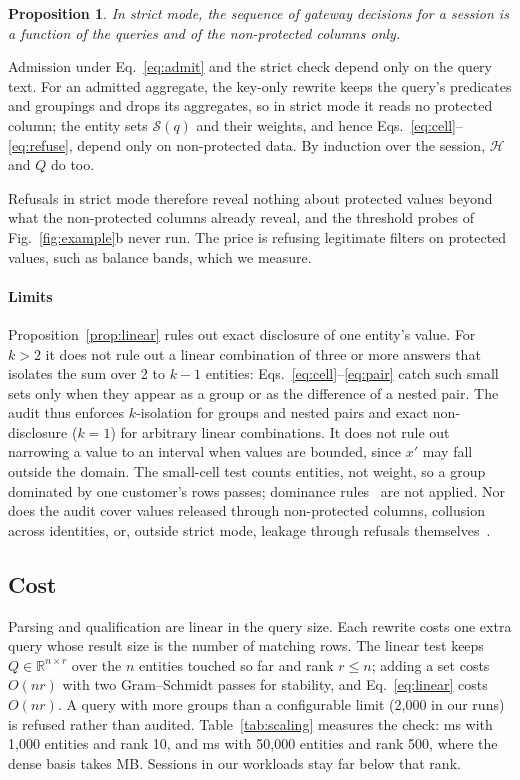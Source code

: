 \documentclass[10pt,journal,compsoc]{IEEEtran}
\newtheorem{proposition}{Proposition}
\begin{document}
\begin{proposition}\label{prop:strict}
In strict mode, the sequence of gateway decisions for a session is a function of the queries and of the non-protected columns only.
\end{proposition}
\begin{IEEEproof}
Admission under Eq.~\ref{eq:admit} and the strict check depend only on the query text. For an admitted aggregate, the key-only rewrite keeps the query's predicates and groupings and drops its aggregates, so in strict mode it reads no protected column; the entity sets $\mathcal{S}(q)$ and their weights, and hence Eqs.~\ref{eq:cell}--\ref{eq:refuse}, depend only on non-protected data. By induction over the session, $\mathcal{H}$ and $Q$ do too.
\end{IEEEproof}
Refusals in strict mode therefore reveal nothing about protected values beyond what the non-protected columns already reveal, and the threshold probes of Fig.~\ref{fig:example}b never run. The price is refusing legitimate filters on protected values, such as balance bands, which we measure.

\paragraph*{Limits} Proposition~\ref{prop:linear} rules out exact disclosure of one entity's value. For $k>2$ it does not rule out a linear combination of three or more answers that isolates the sum over 2 to $k-1$ entities: Eqs.~\ref{eq:cell}--\ref{eq:pair} catch such small sets only when they appear as a group or as the difference of a nested pair. The audit thus enforces $k$-isolation for groups and nested pairs and exact non-disclosure ($k=1$) for arbitrary linear combinations. It does not rule out narrowing a value to an interval when values are bounded, since $x'$ may fall outside the domain. The small-cell test counts entities, not weight, so a group dominated by one customer's rows passes; dominance rules~\cite{adam1989security} are not applied. Nor does the audit cover values released through non-protected columns, collusion across identities, or, outside strict mode, leakage through refusals themselves~\cite{kenthapadi2005simulatable}.

\subsection{Cost}
Parsing and qualification are linear in the query size. Each rewrite costs one extra query whose result size is the number of matching rows. The linear test keeps $Q\in\mathbb{R}^{n\times r}$ over the $n$ entities touched so far and rank $r\le n$; adding a set costs $O(nr)$ with two Gram--Schmidt passes for stability, and Eq.~\ref{eq:linear} costs $O(nr)$. A query with more groups than a configurable limit (2,000 in our runs) is refused rather than audited. Table~\ref{tab:scaling} measures the check: \Nscalesmallms{} ms with 1,000 entities and rank 10, and \Nscalebigms{} ms with 50,000 entities and rank 500, where the dense basis takes \Nscalebigmb{} MB. Sessions in our workloads stay far below that rank.
\end{document}

